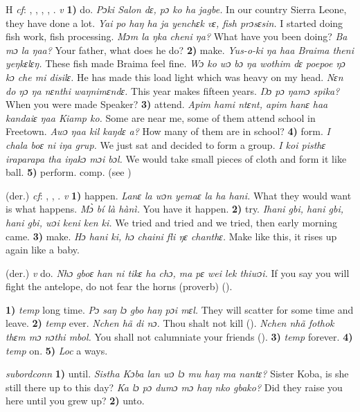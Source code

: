 \begin{letter}{H}
 \textit{cf}: , , , , . \textit{v} \textbf{1)} do. \textit{Pɔki Salon dɛ, pɔ ko ha jagbe.} In our country Sierra Leone, they have done a lot. \textit{Yai po haŋ ha ja yenchɛk vɛ, fish prɔsɛsin.} I started doing fish work, fish processing. \textit{Mɔm la ŋka cheni ŋa?} What have you been doing? \textit{Ba mɔ la ŋaa?} Your father, what does he do? \textbf{2)} make. \textit{Yus-o-ki ŋa haa Braima theni yeŋkɛlɛŋ.} These fish made Braima feel fine. \textit{Wɔ ko wɔ bɔ ŋa wothim dɛ poepoe ŋɔ kɔ che mi disilɛ.} He has made this load light which was heavy on my head. \textit{Nɛn do ŋɔ ŋa nɛnthi waŋnimɛndɛ.} This year makes fifteen years. \textit{Ŋɔ pɔ ŋamɔ spika?} When you were made Speaker? \textbf{3)} attend. \textit{Apim hami ntɛnt, apim hanɛ haa kandaiɛ ŋaa Kiamp ko.} Some are near me, some of them attend school in Freetown. \textit{Awɔ ŋaa kil kaŋdɛ a?} How many of them are in school? \textbf{4)} form. \textit{I chala boɛ ni iŋa grup.} We just sat and decided to form a group. \textit{I koi pisthɛ iraparapa tha iŋakɔ mɔi bɔl.} We would take small pieces of cloth and form it like ball. \textbf{5)} perform. comp.  (see )

 (der.) \textit{cf}: , , . \textit{v} \textbf{1)} happen. \textit{Lanɛ la wɔn yemaɛ la ha hani.} What they would want is what happens. \textit{Mɔ̀ bí là hànì.} You have it happen. \textbf{2)} try. \textit{Ihani gbi, hani gbi, hani gbi, wɔi keni ken ki.} We tried and tried and we tried, then early morning came. \textbf{3)} make. \textit{Hɔ hani ki, hɔ chaini fli ŋɛ chanthɛ.} Make like this, it rises up again like a baby.

 (der.) \textit{v} do. \textit{Nhɔ gboɛ han ni tikɛ ha chɔ, ma pɛ wei lek thiwɔi.} If you say you will fight the antelope, do not fear the horns (proverb) (\citealt{TISLL1979}).

 \textbf{1)} \textit{temp} long time. \textit{Pɔ saŋ lɔ gbo haŋ pɔi mɛl.} They will scatter for some time and leave. \textbf{2)} \textit{temp} ever. \textit{Nchen hã di nɔ.} Thou shalt not kill (\citealt{Pichl1967}). \textit{Nchen nhã fothok thɛm mɔ nɔthi mbol.} You shall not calumniate your friends (\citealt{Pichl1967}). \textbf{3)} \textit{temp} forever. \textbf{4)} \textit{temp} on. \textbf{5)} \textit{Loc} a ways.

 \textit{subordconn} \textbf{1)} until. \textit{Sistha Kɔba lan wɔ lɔ mu haŋ ma nantɛ?} Sister Koba, is she still there up to this day? \textit{Ka lɔ pɔ dumɔ mɔ haŋ nko gbako?} Did they raise you here until you grew up? \textbf{2)} unto.


\end{letter}
